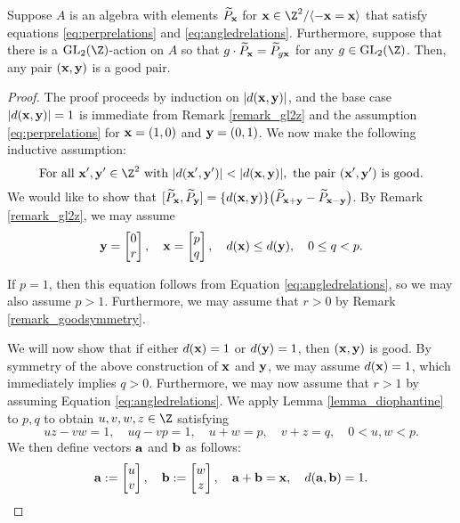 \begin{proposition}\label{lemma_allfromsome}
Suppose $A$ is an algebra with elements $\widetilde{P}_{\mathbf{x}}$ for $\xx \in \Z^2/\langle -\xx = \xx \rangle$ that satisfy equations \eqref{eq:perprelations} and \eqref{eq:angledrelations}. Furthermore, suppose that there is a $\GL_2(\Z)$-action on $A$ so that $g \cdot \widetilde{P}_{\mathbf{x}} = \widetilde{P}_{g {\mathbf{x}}}$ for any $g \in \GL_2(\Z)$. Then, any pair $({\mathbf{x}}, {\mathbf{y}})$ is a good pair. 
\end{proposition}
\begin{proof}
	The proof proceeds by induction on $\lvert d({\mathbf{x}},{\mathbf{y}})\rvert $, and the base case $\lvert d({\mathbf{x}},{\mathbf{y}})\rvert = 1$ is immediate from Remark \ref{remark_gl2z} and the assumption \eqref{eq:perprelations} for ${\mathbf{x}} = (1,0)$ and ${\mathbf{y}} = (0,1)$. We now make the following inductive assumption:
	\begin{equation}\label{assumption1} 
	\textrm{For all } \xx',\yy' \in \Z^2\textrm{ with } \lvert d(\xx',\yy')\rvert < \lvert d(\xx,\yy) \rvert, \textrm{ the pair } (\xx',\yy') \textrm{ is good.}
	\end{equation}
	We would like to show that $[\widetilde{P}_{{\mathbf{x}}},\widetilde{P}_{{\mathbf{y}}}] = \{d({\mathbf{x}},{\mathbf{y}})\} \big( \widetilde{P}_{{\mathbf{x}} + {\mathbf{y}}} - \widetilde{P}_{{\mathbf{x}}-{\mathbf{y}}} \big)$. By Remark \ref{remark_gl2z}, we may assume
	\[
	{\mathbf{y}} = \begin{bmatrix}0\\r\end{bmatrix},\quad {\mathbf{x}} = \begin{bmatrix}p\\q\end{bmatrix},\quad d({\mathbf{x}}) \leq d({\mathbf{y}}),\quad 0 \leq q < p.
	\]
	
	If $p=1$, then this equation follows from Equation \eqref{eq:angledrelations}, so we may also assume $p > 1$. Furthermore, we may assume that $r>0$ by Remark \ref{remark_goodsymmetry}. 

	We will now show that if either $d({\mathbf{x}})=1$ or $d({\mathbf{y}})=1$, then $({\mathbf{x}},{\mathbf{y}})$ is good. By symmetry of the above construction of ${\mathbf{x}}$ and ${\mathbf{y}}$, we may assume $d({\mathbf{x}})=1$, which immediately implies $q>0$. Furthermore, we may now assume that $r>1$ by assuming Equation \eqref{eq:angledrelations}. We apply Lemma \ref{lemma_diophantine} to $p, q$ to obtain  $u,v,w,z \in \Z$ satisfying 
	\begin{equation}\label{assumption1.49}
	uz - vw = 1,\quad uq - vp = 1,\quad u + w = p,\quad v + z = q,\quad 0 < u,w < p.
	\end{equation}
	We then define vectors ${\mathbf{a}}$ and ${\mathbf{b}}$ as follows:
	\begin{equation}\label{assumption1.9}
	\aab := \begin{bmatrix}  u\\ v\end{bmatrix},\quad 
	\bb := \begin{bmatrix} w\\ z\end{bmatrix},
	\quad \aab + \bb = \xx,\quad d(\aab, \bb) = 1. %
	\end{equation}


\end{proof}
